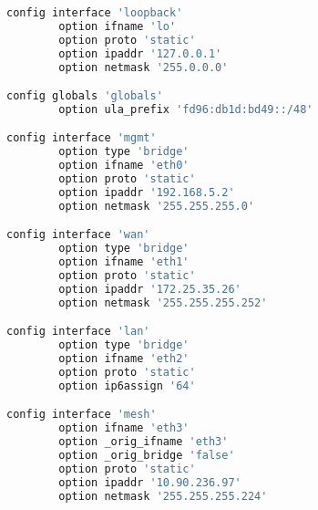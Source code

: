 \begin{lstlisting}[language=bash, caption={Network}]
config interface 'loopback'
        option ifname 'lo'
        option proto 'static'
        option ipaddr '127.0.0.1'
        option netmask '255.0.0.0'

config globals 'globals'
        option ula_prefix 'fd96:db1d:bd49::/48'

config interface 'mgmt'
        option type 'bridge'
        option ifname 'eth0'
        option proto 'static'
        option ipaddr '192.168.5.2'
        option netmask '255.255.255.0'

config interface 'wan'
        option type 'bridge'
        option ifname 'eth1'
        option proto 'static'
        option ipaddr '172.25.35.26'
        option netmask '255.255.255.252'

config interface 'lan'
        option type 'bridge'
        option ifname 'eth2'
        option proto 'static'
        option ip6assign '64'

config interface 'mesh'
        option ifname 'eth3'
        option _orig_ifname 'eth3'
        option _orig_bridge 'false'
        option proto 'static'
        option ipaddr '10.90.236.97'
        option netmask '255.255.255.224'
\end{lstlisting}